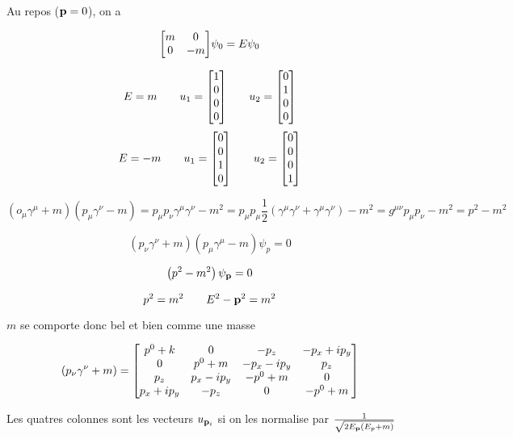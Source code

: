 Au repos ($\vb{p} = 0$), on a 

$$\mqty[m& 0 \\0 &-m]\psi_0 = E\psi_0$$ 

$$E= m \qquad u_1 = \mqty[1\\0\\0\\0] \qquad u_2 =\mqty[0\\1\\0\\0]$$ 
$$E= -m \qquad u_1 = \mqty[0\\0\\1\\0] \qquad u_2 =\mqty[0\\0\\0\\1]$$ 


$$\left( o_{\mu} \gamma^{\mu}+m \right) \left( p_{\mu} \gamma^{\nu}-m \right) = p_{\mu} p_{\nu}\gamma^{\mu}\gamma^{\nu}-m^{2}= p_{\mu} p_{\mu} \frac{1}{2} \left( \gamma^{\mu}\gamma^{\nu}+ \gamma^{\mu}\gamma^\nu \right)  -m^{2}= g^{\mu\nu}p_{\mu} p_{\nu} -m^{2}= p^{2}- m^{2}$$ 



$$\left( p_{\nu} \gamma^{\nu}+m \right) \boxed{\left( p_{\mu} \gamma^{\mu}-m \right) \psi_p} =0$$ 

$$\left( p^{2}- m^2 \right) \psi_{\vb{p}} = 0$$ 

$$p^{2}= m^{2}\qquad E^{2}-\vb{p}^2 =m^2$$ 

$m$ se comporte donc bel et bien comme une masse 

$$\left( p_{\nu} \gamma^{\nu}+m  \right) =  \mqty[p^{0}+k &0 &- p_z & -p_x + ip_y \\ 0&  p^{0}+m & -p_x -ip_y & p_{z}\\ p_z & p_x - ip_y & -p^{0}+m &0 \\ p_x + ip_y & -p_z &0 & -p^{0}+m]$$ 


Les quatres colonnes sont les vecteurs $u_{\vb{p}_i} $ si on les normalise par $\frac{1}{\sqrt{2E_{\vb{p}} \left( E_p + m \right)  }} $  







